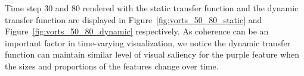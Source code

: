 Time step 30 and 80 rendered with the static transfer function and the dynamic transfer function are displayed in Figure~\ref{fig:vorts_50_80_static} and Figure~\ref{fig:vorts_50_80_dynamic} respectively. As coherence can be an important factor in time-varying visualization, we notice the dynamic transfer function can maintain similar level of visual saliency for the purple feature when the sizes and proportions of the features change over time.


%

%



